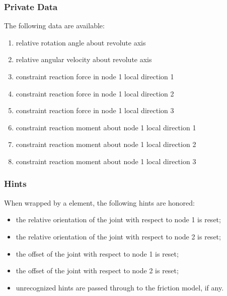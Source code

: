 \subsubsection{Private Data}
The following data are available:
\begin{enumerate}
\item {} relative rotation angle about revolute axis
\item {} relative angular velocity about revolute axis
\item {} constraint reaction force in node 1 local direction 1
\item {} constraint reaction force in node 1 local direction 2
\item {} constraint reaction force in node 1 local direction 3
\item {} constraint reaction moment about node 1 local direction 1
\item {} constraint reaction moment about node 1 local direction 2
\item {} constraint reaction moment about node 1 local direction 3
\end{enumerate}

\subsubsection{Hints}
When wrapped by a  element, the following hints are honored:
\begin{itemize}
\item {} the relative orientation of the joint
with respect to node 1 is reset;
\item {} the relative orientation of the joint
with respect to node 2 is reset;
\item {} the offset of the joint
with respect to node 1 is reset;
\item {} the offset of the joint
with respect to node 2 is reset;
\item unrecognized hints are passed through to the friction model,
if any.
\end{itemize}




